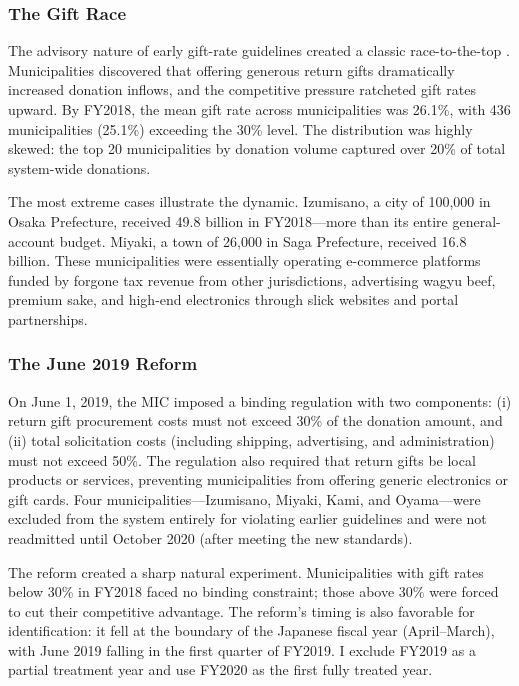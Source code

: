 \documentclass[12pt]{article}
\newcommand{\textyen}{\text{\yen}}
\begin{document}
\subsubsection*{The Gift Race} The advisory nature of early gift-rate guidelines created a classic race-to-the-top \citep{zodrow1986pigou, brueckner2003strategic}. Municipalities discovered that offering generous return gifts dramatically increased donation inflows, and the competitive pressure ratcheted gift rates upward. By FY2018, the mean gift rate across municipalities was 26.1\%, with 436 municipalities (25.1\%) exceeding the 30\% level. The distribution was highly skewed: the top 20 municipalities by donation volume captured over 20\% of total system-wide donations.

The most extreme cases illustrate the dynamic. Izumisano, a city of 100,000 in Osaka Prefecture, received \textyen 49.8 billion in FY2018---more than its entire general-account budget. Miyaki, a town of 26,000 in Saga Prefecture, received \textyen 16.8 billion. These municipalities were essentially operating e-commerce platforms funded by forgone tax revenue from other jurisdictions, advertising wagyu beef, premium sake, and high-end electronics through slick websites and portal partnerships.

\subsubsection*{The June 2019 Reform} On June 1, 2019, the MIC imposed a binding regulation with two components: (i) return gift procurement costs must not exceed 30\% of the donation amount, and (ii) total solicitation costs (including shipping, advertising, and administration) must not exceed 50\%. The regulation also required that return gifts be local products or services, preventing municipalities from offering generic electronics or gift cards. Four municipalities---Izumisano, Miyaki, Kami, and Oyama---were excluded from the system entirely for violating earlier guidelines and were not readmitted until October 2020 (after meeting the new standards).

The reform created a sharp natural experiment. Municipalities with gift rates below 30\% in FY2018 faced no binding constraint; those above 30\% were forced to cut their competitive advantage. The reform's timing is also favorable for identification: it fell at the boundary of the Japanese fiscal year (April--March), with June 2019 falling in the first quarter of FY2019. I exclude FY2019 as a partial treatment year and use FY2020 as the first fully treated year.
\end{document}
